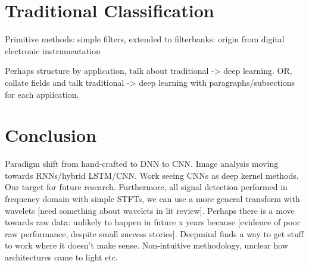 \documentclass[12pt]{llncs}
\begin{document}
\section{Traditional Classification}
\label{sec:traditional}

Primitive methods: simple filters, extended to filterbanks: origin from digital electronic instrumentation



Perhaps structure by application, talk about traditional -> deep learning. OR, collate fields and talk traditional -> deep learning with paragraphs/subsections for each application.


\section{Conclusion}
\label{sec:litreviewconclusion}
Paradigm shift from hand-crafted to DNN to CNN. Image analysis moving towards RNNs/hybrid LSTM/CNN. Work seeing CNNs as deep kernel methods. Our target for future research. Furthermore, all signal detection performed in frequency domain with simple STFTs, we can use a more general transform with wavelets [need something about wavelets in lit review]. Perhaps there is a move towards raw data: unlikely to happen in future x years because [evidence of poor raw performance, despite small success stories]. Deepmind finds a way to get stuff to work where it doesn't make sense. Non-intuitive methodology, unclear how architectures came to light etc.


\end{document}
